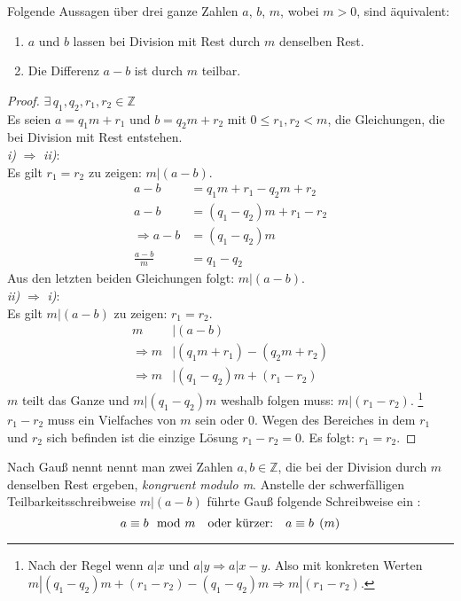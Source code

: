 \begin{lemma}
  Folgende Aussagen über drei ganze Zahlen $a$, $b$, $m$, wobei $m > 0$, sind äquivalent:
  \begin{enumerate}[label=\roman*), itemsep = 0pt]
    \item $a$ und $b$ lassen bei Division mit Rest durch $m$ denselben Rest.
    \item Die Differenz $a - b$ ist durch $m$ teilbar.
  \end{enumerate}
\end{lemma}
\begin{proof}
  $\exists \, q_1,q_2,r_1,r_2 \in \mathbb{Z}$ \\
  Es seien $a = q_1m + r_1$ und $b = q_2m + r_2$ mit $0 \leq r_1,r_2 < m$,
  die Gleichungen, die bei Division mit Rest entstehen. \\
  \textit{i)} $\Rightarrow$ \textit{ii)}: \\
  Es gilt $r_1 = r_2$ zu zeigen: $m|(a-b)$.
  \begin{align*}
    a - b             & = q_1m + r_1 - q_2m + r_2  \\
    a - b             & = (q_1 - q_2)m + r_1 - r_2 \\
    \Rightarrow a - b & = (q_1 - q_2)m             \\
    \frac{a - b}{m}   & = q_1 - q_2
  \end{align*}
  Aus den letzten beiden Gleichungen folgt: $m | (a - b)$. \\
  \textit{ii)} $\Rightarrow$ \textit{i)}: \\
  Es gilt $m | (a - b)$ zu zeigen: $r_1 = r_2$.
  \begin{align*}
    m             & | (a - b)                     \\
    \Rightarrow m & | (q_1m + r_1) - (q_2m + r_2) \\
    \Rightarrow m & | (q_1 - q_2)m + (r_1 - r_2)
  \end{align*}
  $m$ teilt das Ganze und $m|(q_1 - q_2)m$ weshalb folgen muss: $m|(r_1 - r_2)$.
  \footnote{Nach der Regel wenn $a|x$ und $a|y \Rightarrow a|x-y$.
    Also mit konkreten Werten $m|(q_1 - q_2)m + (r_1 - r_2) - (q_1 - q_2)m \Rightarrow m|(r_1 - r_2)$.} \\
  $r_1 - r_2$ muss ein Vielfaches von $m$ sein oder 0. Wegen des Bereiches in dem $r_1$ und $r_2$
  sich befinden ist die einzige Lösung $r_1 - r_2 = 0$. Es folgt: $r_1 = r_2$.
\end{proof}

\newpage
\noindent
Nach Gauß nennt nennt man zwei Zahlen $a, b \in \mathbb{Z}$, die bei der Division durch $m$
denselben Rest ergeben, \textit{kongruent modulo m}. Anstelle der schwerfälligen
Teilbarkeitsschreibweise $m|(a - b)$
führte Gauß folgende Schreibweise ein \parencite[180]{BOOK:numberTheory}:
\begin{equation*}
  a \equiv b \mod{m} \text{\quad oder kürzer:\quad} a \equiv b \pod{m}
\end{equation*}


